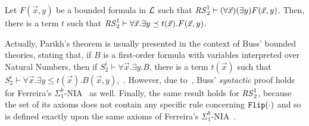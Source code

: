\begin{prop}\label{prop:Parikh}
Let $F(\vec{x},y)$ be a bounded formula in $\mathcal{L}$
such that ${\mathit{RS}^1_2}\vdash(\forall \vec{x})(\exists y)F(\vec{x},y)$.
Then, there is a term $t$ such that
${\mathit{RS}^1_2} \vdash \forall \vec{x}.\exists y\preceq t(\vec{x}).F(\vec{x},y)$.
\end{prop}
\noindent
Actually, Parikh's theorem is usually presented
in the context of Buss' bounded theories, stating that, if $B$ is a first-order formula with variables interpreted over Natural Numbers,
then if $S^i_2 \vdash \forall \vec{x}.\exists y.
B$, there is a term $t(\vec{x})$
such that  $S^i_2\vdash\forall\vec{x}.\exists y\leq
t(\vec{x}).B(\vec{x},y)$,~\cite{Buss86,Buss98}.
However, due to~\cite{FerreiraOitavem},
Buss' \emph{syntactic} proof holds for
Ferreira's
$\Sigma^b_1$-NIA~\cite{Ferreira88} as well. Finally,
the same result holds for
${\mathit{RS}^1_2}$, because the set of its axioms does not contain
any specific rule concerning $\mathtt{Flip}(\cdot)$
and so is defined exactly upon the same axioms
of Ferreira's $\Sigma^b_1$-NIA~\cite{Ferreira90}.


